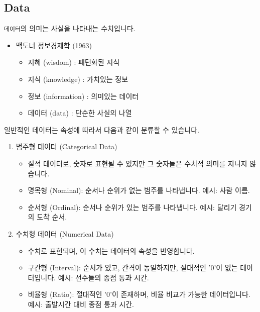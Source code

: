 \documentclass[
  a4paper,
]{book}
\providecommand{\tightlist}{%
  \setlength{\itemsep}{0pt}\setlength{\parskip}{0pt}}\usepackage{longtable,booktabs,array}
\begin{document}
\hypertarget{data}{%
\subsection{Data}\label{data}}

\texttt{데이터}의 의미는 사실을 나타내는 수치입니다.

\begin{itemize}
\tightlist
\item
  맥도너 정보경제학 (1963)

  \begin{itemize}
  \tightlist
  \item
    지혜 (wisdom) : 패턴화된 지식
  \item
    지식 (knowledge) : 가치있는 정보
  \item
    정보 (information) : 의미있는 데이터
  \item
    데이터 (data) : 단순한 사실의 나열
  \end{itemize}
\end{itemize}

일반적인 데이터는 속성에 따라서 다음과 같이 분류할 수 있습니다.

\begin{enumerate}
\def\labelenumi{\arabic{enumi}.}
\tightlist
\item
  범주형 데이터 (Categorical Data)

  \begin{itemize}
  \tightlist
  \item
    질적 데이터로, 숫자로 표현될 수 있지만 그 숫자들은 수치적 의미를
    지니지 않습니다.
  \item
    명목형 (Nominal): 순서나 순위가 없는 범주를 나타냅니다. 예시: 사람
    이름.
  \item
    순서형 (Ordinal): 순서나 순위가 있는 범주를 나타냅니다. 예시: 달리기
    경기의 도착 순서.
  \end{itemize}
\item
  수치형 데이터 (Numerical Data)

  \begin{itemize}
  \tightlist
  \item
    수치로 표현되며, 이 수치는 데이터의 속성을 반영합니다.
  \item
    구간형 (Interval): 순서가 있고, 간격이 동일하지만, 절대적인 '0'이
    없는 데이터입니다. 예시: 선수들의 종점 통과 시간.
  \item
    비율형 (Ratio): 절대적인 '0'이 존재하며, 비율 비교가 가능한
    데이터입니다. 예시: 출발시간 대비 종점 통과 시간.
  \end{itemize}
\end{enumerate}
\end{document}
